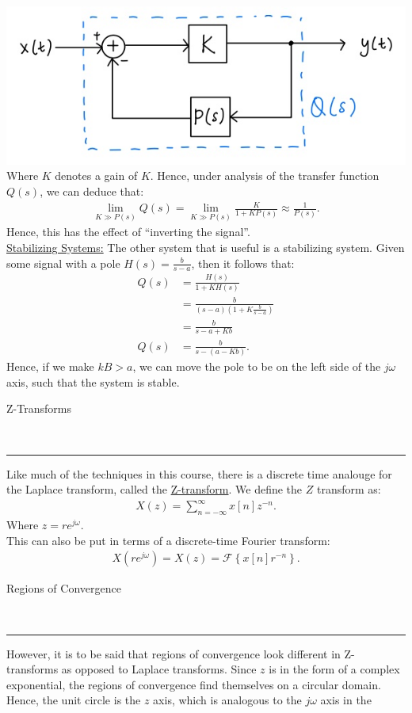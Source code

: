 \documentclass{article}
\newcommand{\sheader}[1]{\underline{#1:}}
\newcommand{\curly}[1]{\left\{#1\right\}}
\newcommand{\header}[1]{\begin{large}\noindent #1\end{large}\\\rule{\textwidth}{0.5pt}}
\newcommand{\gap}{\medskip\\}
\newcommand{\jomega}{{j\omega}}
\newcommand{\Fourier}{\mathcal{F}}
\begin{document}
\includegraphics[scale=0.3]{inverse-system.jpg}\\
Where $K$ denotes a gain of $K$. Hence, under analysis of the transfer function $Q(s)$,
we can deduce that:
\begin{align*}
    \lim_{K \gg P(s)} Q(s) = \lim_{K \gg P(s)}{\frac{K}{1 + KP(s)}} \approx \frac{1}{P(s)}.
\end{align*}
Hence, this has the effect of ``inverting the signal''.
\gap
\sheader{Stabilizing Systems} The other system that is useful is a stabilizing system. Given 
some signal with a pole $H(s) = \frac{b}{s-a}$, then it follows that:
\begin{align*}
    Q(s) &= \frac{H(s)}{1 + KH(s)}\\
    &= \frac{b}{(s-a)(1 + K \frac{b}{s-a})}\\
    &= \frac{b}{s - a + Kb}\\
    Q(s) &= \frac{b}{s - (a - Kb)}.
\end{align*}
Hence, if we make $kB > a$, we can move the pole to be on the left side of the $\jomega$ axis,
such that the system is stable.
\gap
\header{Z-Transforms}
Like much of the techniques in this course, there is a discrete time analouge for the 
Laplace transform, called the \underline{Z-transform}. We define the $Z$ transform as:
\begin{align*}
    X(z) = \sum_{n = - \infty}^\infty x[n]z^{-n}.
\end{align*}
Where $z = re^\jomega$. \gap
This can also be put in terms of a discrete-time Fourier transform:
\begin{align*}
    X(re^\jomega) = X(z) = \Fourier\curly{x[n]r^{-n}}.
\end{align*}
\header{Regions of Convergence} However, it is to be said that regions of convergence look
different in Z-transforms as opposed to Laplace transforms. Since $z$ is in the form of 
a complex exponential, the regions of convergence find themselves on a circular domain. 
Hence, the unit circle is the $z$ axis, which is analogous to the $\jomega$ axis in the 
\end{document}
